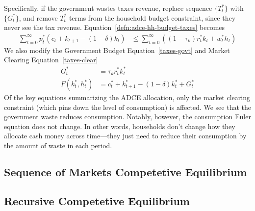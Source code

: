 \documentclass[12pt]{article}
\theoremstyle{plain}
\theoremstyle{definition}
\theoremstyle{remark}
\newcommand{\sumtinfz}{\sum^\infty_{t=0}}
\begin{document}
\begin{enumerate}
    Specifically, if the government wastes taxes revenue, replace
    sequence $\{T^*_t\}$ with $\{G^*_t\}$, and remove $T^*_t$ terms from
    the household budget constraint, since they never see the tax
    revenue.  Equation~\ref{defn:adce-hh-budget-taxes} becomes
    \begin{align*}
        \sumtinfz p^*_t(c_t + k_{t+1}-(1-\delta)k_t) &\leq
        \sumtinfz ((1-\tau_k)r^*_t k_t + w^*_t h_t)
    \end{align*}
    We also modify the Government Budget Equation~\ref{taxes-govt} and
    Market Clearing Equation~\ref{taxes-clear}
    \begin{align*}
      G^*_t &=  \tau_k r^*_t k^*_t \\
      F(k^*_t,h_t^*) &= c_t^* + k^*_{t+1} - (1-\delta)k_t^* + G^*_t
    \end{align*}
    Of the key equations summarizing the ADCE allocation, only the
    market clearing constraint (which pins down the level of
    consumption) is affected. We see that the government waste reduces
    consumption.
    Notably, however, the consumption Euler equation does not change. In
    other words, households don't change how they allocate cash money
    across time---they just need to reduce their consumption by the
    amount of waste in each period.
\end{enumerate}

\subsection{Sequence of Markets Competetive Equilibrium}
\subsection{Recursive Competetive Equilibrium}


\end{document}
